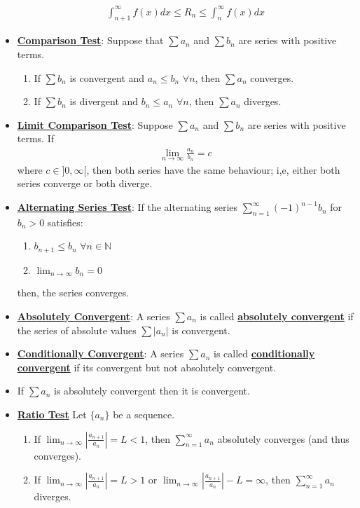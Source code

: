 \documentclass[reqno,11pt]{amsart}
\theoremstyle{definition}
\theoremstyle{remark}
\newcommand{\dfn}[1]{\underline{\textbf{#1}}}
\begin{document}
\begin{itemize}[noitemsep]
	\begin{align}
		\int_{n+1}^\infty f(x) dx \leq R_n \leq \int_n^\infty f(x) dx 	
	\end{align}
	\item \dfn{Comparison Test}: Suppose that $\sum a_n$ and $\sum b_n$ are series with positive terms. 
	\begin{enumerate}[noitemsep]
		\item If $\sum b_n$ is convergent and $a_n \leq b_n $ $\forall n$, then $\sum a_n$ converges. 
		\item If $\sum b_n$ is divergent and $b_n \leq a_n$ $\forall n$, then $\sum a_n$ diverges. 
	\end{enumerate}
	\item \dfn{Limit Comparison Test}: Suppose $\sum a_n$ and $\sum b_n$ are series with positive terms. If 
	\begin{align*}
		\lim_{n \rightarrow \infty} \frac{a_n}{b_n} = c
	\end{align*}
	where $c \in ]0, \infty[$, then both series have the same behaviour; i,e, either both series converge or both diverge. 
	\item \dfn{Alternating Series Test}: If the alternating series $\sum_{n=1}^\infty (-1)^{n-1} b_n$ for $b_n > 0$ satisfies: 
	\begin{enumerate}[noitemsep]
		\item $b_{n+1} \leq b_n$ $\forall n \in \mathbb{N}$
		\item $\lim_{n \rightarrow \infty} b_n = 0$
	\end{enumerate}
	then, the series converges. 
	\item \dfn{Absolutely Convergent}: A series $\sum a_n$ is called \dfn{absolutely convergent} if the series of absolute values $\sum |a_n|$ is convergent. 
	\item \dfn{Conditionally Convergent}: A series $\sum a_n$ is called \dfn{conditionally convergent} if its convergent but not absolutely convergent. 
	\item If $\sum a_n$ is absolutely convergent then it is convergent.
	\item \dfn{Ratio Test} Let $\{ a_n \}$ be a sequence.
	\begin{enumerate}[noitemsep]
		\item If $\lim_{n \rightarrow \infty} \left| \frac{a_{n+1}}{a_n} \right| = L < 1$, then $\sum_{n=1}^\infty a_n $ absolutely converges (and thus converges).
		\item If $\lim_{n \rightarrow \infty} \left| \frac{a_{n+1}}{a_n} \right| = L > 1$ or $\lim_{n \rightarrow \infty} \left| \frac{a_{n+1}}{a_n} \right| - L = \infty $, then $\sum_{n=1}^\infty a_n $ diverges. 

\end{enumerate}
\end{itemize}
\end{document}
